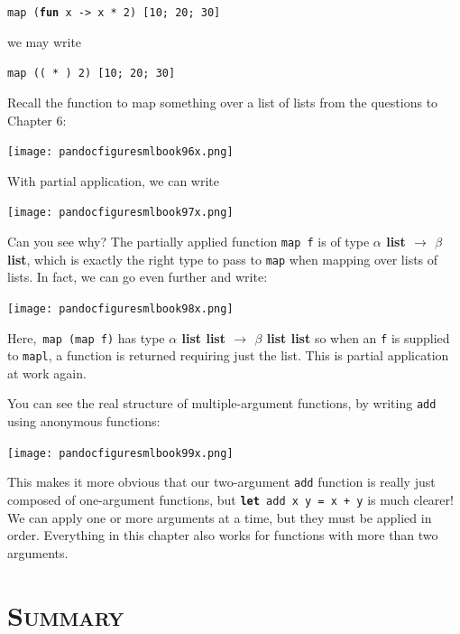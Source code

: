\documentclass[]{book}
\newcommand{\smspace}{\vspace{4mm}}
\begin{document}
\smspace
\texttt{map (\textbf{fun} x -> x * 2) [10; 20; 30]}
\smspace

\noindent we may write

\smspace
\texttt{map (( * ) 2) [10; 20; 30]}
\smspace

\noindent Recall the function to map something over a list of lists from the questions to Chapter 6:

\medskip
\begin{center}
\noindent\texttt{[image: pandocfiguresmlbook96x.png]}
\end{center}
\medskip

\noindent With partial application, we can write

\medskip
\begin{center}
\noindent\texttt{[image: pandocfiguresmlbook97x.png]}
\end{center}
\medskip

\noindent Can you see why? The partially applied function \texttt{map f} is of type \textbf{\textsf{$\alpha$ list $\rightarrow$ $\beta$ list}}, which is exactly the right type to pass to \texttt{map} when mapping over lists of lists. In fact, we can go even further and write:

\medskip
\begin{center}
\noindent\texttt{[image: pandocfiguresmlbook98x.png]}
\end{center}
\medskip

\noindent Here,\, \texttt{map (map f)} has type \textsf{\textbf{$\alpha$ list list $\rightarrow$ $\beta$ list list}} so when an \texttt{f} is supplied to \texttt{mapl}, a function is returned requiring just the list. This is partial application at work again.

You can see the real structure of multiple-argument functions, by writing \texttt{add} using anonymous functions:

\medskip
\begin{center}
\noindent\texttt{[image: pandocfiguresmlbook99x.png]}
\end{center}
\medskip

\noindent This makes it more obvious that our two-argument \texttt{add} function is really just composed of one-argument functions, but \texttt{\textbf{let} add x y = x + y} is much clearer! We can apply one or more arguments at a time, but they must be applied in order. Everything in this chapter also works for functions with more than two arguments. 

\section*{\textsc{Summary}}
\end{document}
